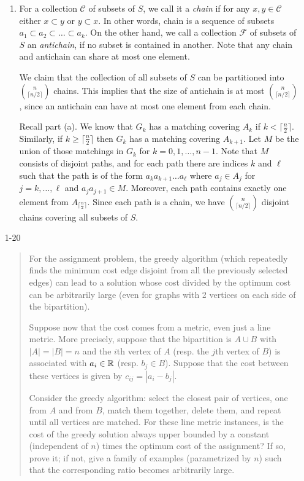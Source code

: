 \documentclass[12pt]{article}
\begin{document}
\begin{enumerate}
\begin{enumerate}
\item For a collection $\mathcal{C}$ of subsets of $S$, we call it a {\it chain} if for any $x, y \in \mathcal{C}$ either $x \subset y$ or $y \subset x$. In other words, chain is a sequence of subsets $a_1 \subset a_2 \subset \dotsc \subset a_k$. On the other hand, we call a collection $\mathcal{F}$ of subsets of $S$ an {\it antichain}, if no subset is contained in another. Note that any chain and antichain can share at most one element.

We claim that the collection of all subsets of $S$ can be partitioned into $\binom{n}{\lceil n/2 \rceil}$ chains. This implies that the size of antichain is at most $\binom{n}{\lceil n/2 \rceil}$, since an antichain can have at most one element from each chain.

Recall part (a). We know that $G_k$ has a matching covering $A_k$ if $k < \lceil \frac{n}{2} \rceil$. Similarly, if $k \geq \lceil \frac{n}{2} \rceil$ then $G_k$ has a matching covering $A_{k+1}$. Let $M$ be the union of those matchings in $G_k$ for $k=0,1,\dotsc,n-1$. Note that $M$ consists of disjoint paths, and for each path there are indices $k$ and $\ell$ such that the path is of the form $a_k a_{k+1} \dotsc a_\ell$ where $a_j \in A_j$ for $j=k, \dotsc, \ell$ and $a_j a_{j+1} \in M$. Moreover, each path contains exactly one element from $A_{\lceil \frac{n}{2} \rceil}$. Since each path is a chain, we have $\binom{n}{\lceil n/2 \rceil}$ disjoint chains covering all subsets of $S$.
\end{enumerate}


\item[1-20]
\begin{quote}
  For the assignment problem, the greedy algorithm (which repeatedly
  finds the minimum cost edge disjoint from all the previously
  selected edges) can lead to a solution whose cost divided by the
  optimum cost can be arbitrarily large (even for graphs with 2
  vertices on each side of the bipartition).

Suppose now that the cost comes from a  metric, even just a line
metric. More precisely, suppose that the bipartition is $A \cup B$
with $|A|=|B|=n$ and the $i$th vertex of $A$ (resp. the $j$th vertex
of $B$) is associated with $a_i\in {\mathbb R}$ (resp. $b_j\in B$). Suppose
that the cost between these vertices is given by $c_{ij}=|a_i-b_j|$.

Consider the greedy algorithm: select the closest pair of vertices,
one from $A$ and from $B$, match them together, delete them, and
repeat until all vertices are matched. For these line metric
instances, is the cost of the greedy solution always upper bounded by
a constant (independent of $n$) times the optimum cost of the
assignment? If so, prove it; if not, give a family of examples
(parametrized by $n$) such that the corresponding ratio becomes
arbitrarily large.
\end{quote}


\end{enumerate}
\end{document}
